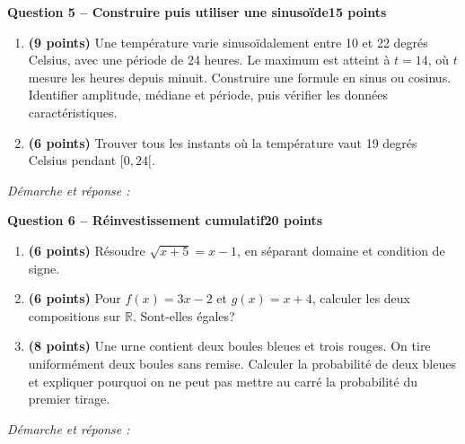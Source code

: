 \documentclass[11pt,a4paper]{article}
\begin{document}
\newpage
{\large\bfseries Question 5 -- Construire puis utiliser une sinusoïde}\hfill\textbf{15 points}\par
\begin{enumerate}
\item \textbf{(9 points)} Une température varie sinusoïdalement entre 10 et 22 degrés Celsius, avec une période de 24 heures. Le maximum est atteint à \(t=14\), où \(t\) mesure les heures depuis minuit. Construire une formule en sinus ou cosinus. Identifier amplitude, médiane et période, puis vérifier les données caractéristiques.
\item \textbf{(6 points)} Trouver tous les instants où la température vaut 19 degrés Celsius pendant \([0,24[\).
\end{enumerate}
\vspace{3mm}\textit{Démarche et réponse :}\par\vfill

\newpage
{\large\bfseries Question 6 -- Réinvestissement cumulatif}\hfill\textbf{20 points}\par
\begin{enumerate}
\item \textbf{(6 points)} Résoudre \(\sqrt{x+5}=x-1\), en séparant domaine et condition de signe.
\item \textbf{(6 points)} Pour \(f(x)=3x-2\) et \(g(x)=x+4\), calculer les deux compositions sur \(\mathbb R\). Sont-elles égales?
\item \textbf{(8 points)} Une urne contient deux boules bleues et trois rouges. On tire uniformément deux boules sans remise. Calculer la probabilité de deux bleues et expliquer pourquoi on ne peut pas mettre au carré la probabilité du premier tirage.
\end{enumerate}
\vspace{3mm}\textit{Démarche et réponse :}\par\vfill
\end{document}
